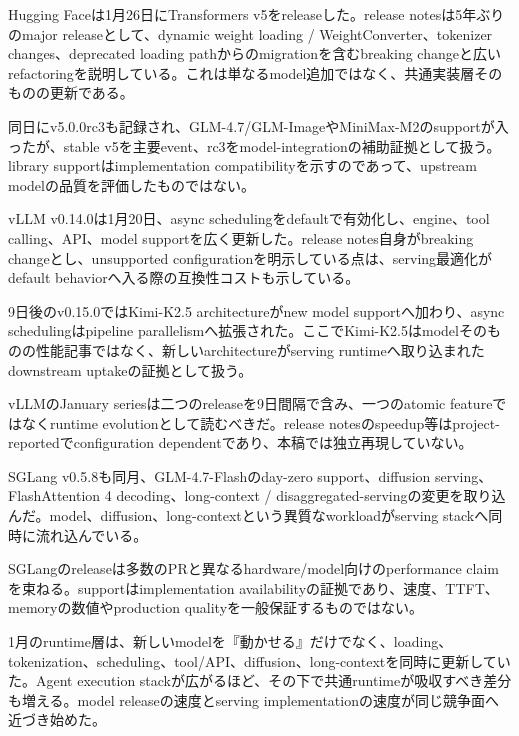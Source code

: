 
Hugging Faceは1月26日にTransformers v5をreleaseした。release notesは5年ぶりのmajor releaseとして、dynamic weight loading / WeightConverter、tokenizer changes、deprecated loading pathからのmigrationを含むbreaking changeと広いrefactoringを説明している。これは単なるmodel追加ではなく、共通実装層そのものの更新である。\autocite{src-152188dd686e}


\begin{claimboundary}
同日にv5.0.0rc3も記録され、GLM-4.7/GLM-ImageやMiniMax-M2のsupportが入ったが、stable v5を主要event、rc3をmodel-integrationの補助証拠として扱う。library supportはimplementation compatibilityを示すのであって、upstream modelの品質を評価したものではない。\autocite{src-152188dd686e,src-9f7ae4228266}
\end{claimboundary}

vLLM v0.14.0は1月20日、async schedulingをdefaultで有効化し、engine、tool calling、API、model supportを広く更新した。release notes自身がbreaking changeとし、unsupported configurationを明示している点は、serving最適化がdefault behaviorへ入る際の互換性コストも示している。\autocite{src-3bc80a3c7870}


9日後のv0.15.0ではKimi-K2.5 architectureがnew model supportへ加わり、async schedulingはpipeline parallelismへ拡張された。ここでKimi-K2.5はmodelそのものの性能記事ではなく、新しいarchitectureがserving runtimeへ取り込まれたdownstream uptakeの証拠として扱う。\autocite{src-d9f9de620203}


\begin{claimboundary}
vLLMのJanuary seriesは二つのreleaseを9日間隔で含み、一つのatomic featureではなくruntime evolutionとして読むべきだ。release notesのspeedup等はproject-reportedでconfiguration dependentであり、本稿では独立再現していない。\autocite{src-3bc80a3c7870,src-d9f9de620203}
\end{claimboundary}

SGLang v0.5.8も同月、GLM-4.7-Flashのday-zero support、diffusion serving、FlashAttention 4 decoding、long-context / disaggregated-servingの変更を取り込んだ。model、diffusion、long-contextという異質なworkloadがserving stackへ同時に流れ込んでいる。\autocite{src-6a97353d35a9}


\begin{claimboundary}
SGLangのreleaseは多数のPRと異なるhardware/model向けのperformance claimを束ねる。supportはimplementation availabilityの証拠であり、速度、TTFT、memoryの数値やproduction qualityを一般保証するものではない。\autocite{src-6a97353d35a9}
\end{claimboundary}

1月のruntime層は、新しいmodelを『動かせる』だけでなく、loading、tokenization、scheduling、tool/API、diffusion、long-contextを同時に更新していた。Agent execution stackが広がるほど、その下で共通runtimeが吸収すべき差分も増える。model releaseの速度とserving implementationの速度が同じ競争面へ近づき始めた。\autocite{src-152188dd686e,src-3bc80a3c7870,src-6a97353d35a9,src-d9f9de620203}
